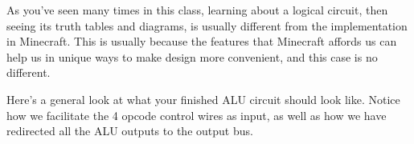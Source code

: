 \documentclass{article}
\begin{document}
As you've seen many times in this class, learning about a logical circuit, then seeing its truth tables and diagrams, is usually different from the implementation in Minecraft.
This is usually because the features that Minecraft affords us can help us in unique ways to make design more convenient, and this case is no different.

Here's a general look at what your finished ALU circuit should look like.
Notice how we facilitate the 4 opcode control wires as input, as well as how we have redirected all the ALU outputs to the output bus.




\begin{tikzpicture}[x=0.75pt,y=0.75pt,yscale=-1,xscale=1]


\end{tikzpicture}
\end{document}
